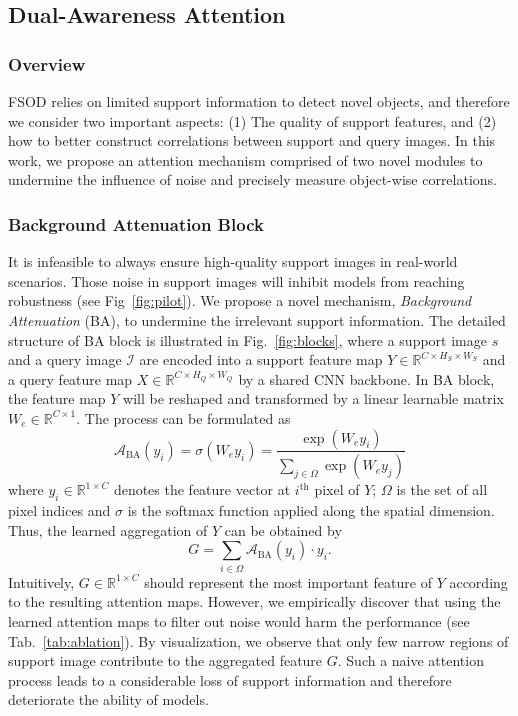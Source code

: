 \documentclass[journal]{IEEEtran}
\begin{document}
\subsection{Dual-Awareness Attention}
\subsubsection{Overview}
FSOD relies on limited support information to detect novel objects, and therefore we consider two important aspects: (1) The quality of support features, and (2) how to better construct correlations between support and query images.
In this work, we propose an attention mechanism comprised of two novel modules to undermine the influence of noise and precisely measure object-wise correlations.


\subsubsection{Background Attenuation Block}
It is infeasible to always ensure high-quality support images in real-world scenarios. 
Those noise in support images will inhibit models from reaching robustness (see Fig~\ref{fig:pilot}).
We propose a novel mechanism, \textit{Background Attenuation} (BA), to undermine the irrelevant support information.
The detailed structure of BA block is illustrated in Fig.~\ref{fig:blocks}, where a support image $s$ and a query image $\mathcal{I}$ are encoded into a support feature map $Y\in\mathbb{R}^{C\times H_S\times W_S}$ and a query feature map $X\in\mathbb{R}^{C\times H_Q \times W_Q}$ by a shared CNN backbone.
In BA block, the feature map $Y$ will be reshaped and transformed by a linear learnable matrix $W_e\in\mathbb{R}^{C\times 1}$.
The process can be formulated as
\begin{equation} \label{eq:attention_in_BA}
    \mathcal{A}_\text{BA} (y_i) = \sigma (W_e y_i) = \frac{\exp(W_e y_i)}{\sum_{j\in\Omega} \exp(W_e y_j)}
\end{equation}
where $y_i\in \mathbb{R}^{1\times C}$ denotes the feature vector at $i^{\text{th}}$ pixel of $Y$; $\Omega$ is the set of all pixel indices and $\sigma$ is the softmax function applied along the spatial dimension.
Thus, the learned aggregation of $Y$ can be obtained by 
\begin{equation}
    G = \sum_{i\in \Omega} \mathcal{A}_\text{BA} (y_i)\cdot y_i .
\end{equation}
Intuitively, $G\in\mathbb{R}^{1\times C}$ should represent the most important feature of $Y$ according to the resulting attention maps.
However, we empirically discover that using the learned attention maps to filter out noise would harm the performance (see Tab.~\ref{tab:ablation}).
By visualization, we observe that only few narrow regions of support image contribute to the aggregated feature $G$.
Such a naive attention process leads to a considerable loss of support information and therefore deteriorate the ability of models.
\end{document}
